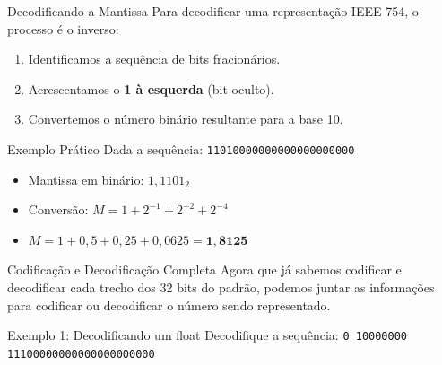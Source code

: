 \begin{frame}{Decodificando a Mantissa}
    Para decodificar uma representação IEEE 754, o processo é o inverso:

    \begin{enumerate}
        \item Identificamos a sequência de bits fracionários.
        \item Acrescentamos o \textbf{1 à esquerda} (bit oculto).
        \item Convertemos o número binário resultante para a base 10.
    \end{enumerate}

    \begin{exampleblock}{Exemplo Prático}
        Dada a sequência: \texttt{11010000000000000000000}
        \begin{itemize}
            \item Mantissa em binário: $1,1101_2$
            \item Conversão: $M = 1 + 2^{-1} + 2^{-2} + 2^{-4}$
            \item $M = 1 + 0,5 + 0,25 + 0,0625 = \mathbf{1,8125}$
        \end{itemize}
    \end{exampleblock}
\end{frame}



\begin{frame}{Codificação e Decodificação Completa}
    Agora que já sabemos codificar e decodificar cada trecho dos 32 bits do padrão, podemos juntar as informações para codificar ou decodificar o número sendo representado.

    \begin{exampleblock}{Exemplo 1: Decodificando um float}
        Decodifique a sequência: \texttt{0 10000000 11100000000000000000000}

    \end{exampleblock}
\end{frame}


